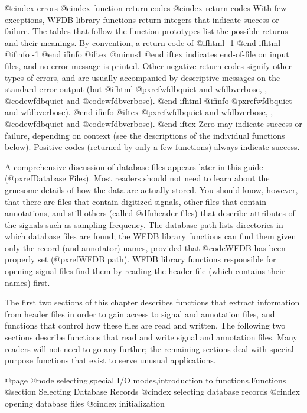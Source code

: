 {{{{{{{{@cindex errors
@cindex function return codes
@cindex return codes
With few exceptions, WFDB library functions return integers that indicate
success or failure.  The tables that follow the function prototypes
list the possible returns and their meanings.  By convention, a
return code of
@ifhtml
-1
@end ifhtml
@ifinfo
-1
@end ifinfo
@iftex
@minus{}1
@end iftex
indicates end-of-file on input files, and no
error message is printed.  Other negative return codes signify other
types of errors, and are usually accompanied by descriptive messages on
the standard error output (but
@ifhtml
@pxref{wfdbquiet and wfdbverbose, , @code{wfdbquiet} and @code{wfdbverbose}}).
@end ifhtml
@ifinfo
@pxref{wfdbquiet and wfdbverbose}).
@end ifinfo
@iftex
@pxref{wfdbquiet and wfdbverbose, , @code{wfdbquiet} and @code{wfdbverbose}}).
@end iftex
Zero may indicate success or failure, depending on context (see the
descriptions of the individual functions below).  Positive codes
(returned by only a few functions) always indicate success.

A comprehensive discussion of database files appears later in this guide
(@pxref{Database Files}).  Most readers should not need to learn about
the gruesome details of how the data are actually stored.  You should
know, however, that there are files that contain digitized signals,
other files that contain annotations, and still others (called
@dfn{header} files) that describe attributes of the signals such as
sampling frequency.  The database path lists directories in which
database files are found; the WFDB library functions can find them given
only the record (and annotator) names, provided that @code{WFDB} has been
properly set (@pxref{WFDB path}).  WFDB library functions responsible for
opening signal files find them by reading the header file (which
contains their names) first.

The first two sections of this chapter describes functions that extract
information from header files in order to gain access to signal
and annotation files, and functions that control how these files
are read and written.  The following two sections describe functions
that read and write signal and annotation files.  Many readers will not need
to go any further; the remaining sections deal with special-purpose
functions that exist to serve unusual applications.

@page
@node selecting,special I/O modes,introduction to functions,Functions
@section Selecting Database Records
@cindex selecting database records
@cindex opening database files
@cindex initialization

}}}}}}}}
